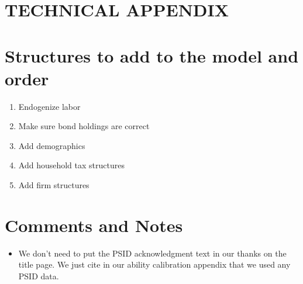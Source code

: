 \documentclass[letterpaper,12pt]{article}
\theoremstyle{definition}
\begin{document}
\newpage
\renewcommand{\theequation}{T.\arabic{section}.\arabic{equation}}
\renewcommand{\thesection}{T-\arabic{section}}   %
\setcounter{equation}{0}                         %
\setcounter{section}{0}                          %
\section*{TECHNICAL APPENDIX}


\section{Structures to add to the model and order}\label{TAppSteps}

  \begin{enumerate}
    \item Endogenize labor
    \item Make sure bond holdings are correct
    \item Add demographics
    \item Add household tax structures
    \item Add firm structures
  \end{enumerate}


\newpage
\section{Comments and Notes}\label{TAppComments}

  \begin{itemize}
    \item We don't need to put the PSID acknowledgment text in our thanks on the title page. We just cite in our ability calibration appendix that we used any PSID data.
  \end{itemize}
\end{document}
